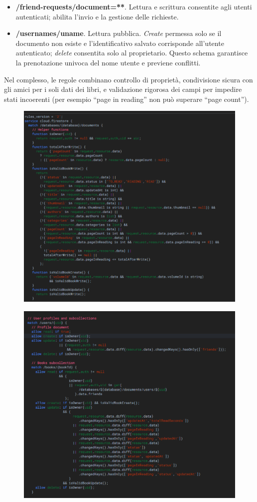 \documentclass{article}
\begin{document}
\begin{itemize}
\begin{itemize}
\begin{itemize}
    \item \textbf{/friend-requests/{document=**}}. Lettura e scrittura consentite agli utenti autenticati; abilita l’invio e la gestione delle richieste.
    \item \textbf{/usernames/{uname}}. Lettura pubblica. \textit{Create} permessa solo se il documento non esiste e l’identificativo salvato corrisponde all’utente autenticato; \textit{delete} consentita solo al proprietario. Questo schema garantisce la prenotazione univoca del nome utente e previene conflitti.
    \end{itemize}
    Nel complesso, le regole combinano controllo di proprietà, condivisione sicura con gli amici per i soli dati dei libri, e validazione rigorosa dei campi per impedire stati incoerenti (per esempio “page in reading” non può superare “page count”).

  
    \begin{figure}[H]
      \centering
      \includegraphics[width=0.7\linewidth]{firebase1.png}
      \label{fig:sitemap}
    \end{figure}

    \begin{figure}[H]
      \centering
      \includegraphics[width=0.7\linewidth]{firebase2.png}
      \label{fig:sitemap}
    \end{figure}


\end{itemize}
\end{itemize}
\end{document}
